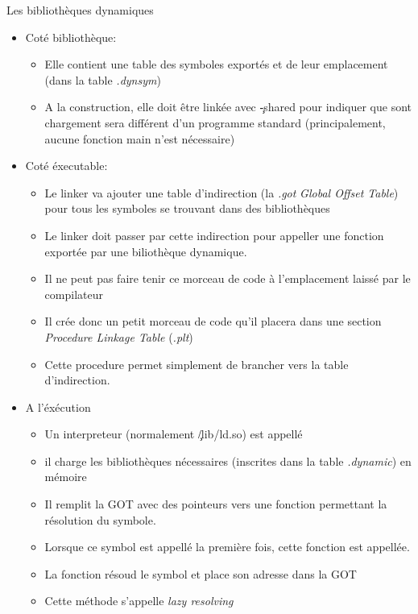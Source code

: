  \begin{frame}[fragile=singleslide]{  Les bibliothèques dynamiques}
  \begin{itemize} 
  \item Coté bibliothèque:
    \begin{itemize} 
    \item Elle  contient une  table des symboles  exportés et  de leur
      emplacement (dans la table \emph{.dynsym})
    \item A  la construction, elle  doit être linkée  avec \c{-shared}
      pour indiquer que sont  chargement sera différent d'un programme
      standard (principalement, aucune fonction main n'est nécessaire)
    \end{itemize} 
  \item Coté éxecutable:
    \begin{itemize} 
    \item Le linker va ajouter une table d'indirection (la \emph{.got}
      \emph{Global Offset  Table}) pour tous les  symboles se trouvant
      dans des bibliothèques
    \item Le  linker doit passer  par cette indirection  pour appeller
      une fonction exportée par une biliothèque dynamique.
    \item  Il  ne   peut  pas  faire  tenir  ce   morceau  de  code  à
      l'emplacement laissé par le compilateur
    \item Il crée donc un petit morceau de code qu'il placera dans une
      section \emph{Procedure Linkage Table} (\emph{.plt})
    \item Cette procedure permet  simplement de brancher vers la table
      d'indirection.
    \end{itemize} 
  \item A l'éxécution
    \begin{itemize} 
    \item Un interpreteur (normalement \c{/lib/ld.so}) est appellé
    \item il  charge les  bibliothèques nécessaires (inscrites  dans la
      table \emph{.dynamic}) en mémoire
    \item  Il remplit  la GOT  avec  des pointeurs  vers une  fonction
      permettant la résolution du symbole.
    \item  Lorsque  ce symbol  est  appellé  la  première fois,  cette
      fonction est appellée.
    \item La fonction résoud le symbol et place son adresse dans la GOT
    \item Cette méthode s'appelle \emph{lazy resolving}

\end{itemize}
\end{itemize}
\end{frame}
